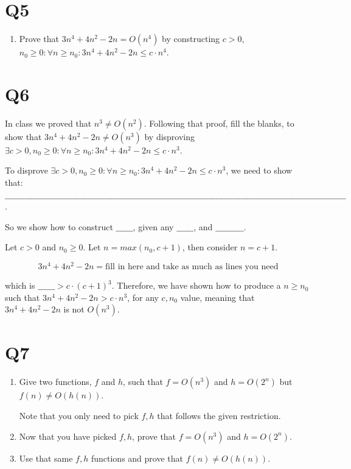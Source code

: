 \documentclass[12pt]{exam}
\begin{document}
\section{Q5}


\begin{enumerate}
    \item Prove that $3n^4 + 4n^2 - 2n = O(n^4)$ by constructing $c > 0$, $n_0 \geq 0 : \forall n \geq n_0 : 3n^4 + 4n^2 - 2n \leq c \cdot n^4.$
\end{enumerate}

\section{Q6}
In class we proved that $n^3 \neq O(n^2)$. Following that proof, fill the blanks, to show that $3n^4 + 4n^2 -2n \neq O(n^3)$ by disproving $\exists c > 0, n_0 \geq 0 : \forall n \geq n_0 : 3n^4 + 4n^2 -2n \leq c \cdot n^3$.

To disprove $\exists c > 0, n_0 \geq 0 : \forall n \geq n_0 : 3n^4 + 4n^2 -2n \leq c \cdot n^3$, we need to show that: $\_\_\_\_\_\_\_\_\_\_\_\_\_\_\_\_\_\_\_\_\_\_\_\_\_\_\_\_\_\_\_\_\_\_\_\_\_\_\_\_\_\_\_\_\_\_\_\_\_\_\_\_\_\_\_\_\_\_\_\_\_\_\_\_\_\_\_\_\_\_\_\_\_\_\_\_\_\_\_\_\_\_\_\_\_\_\_\_\_\_\_\_\_\_\_\_\_\_\_\_\_\_\_\_\_\_\_\_\_\_\_\_\_\_\_\_\_\_\_\_$.

So we show how to construct $\_\_\_\_\_\_$, given any $\_\_\_\_\_\_$, and $\_\_\_\_\_\_\_\_\_\_$.

Let $c > 0$ and $n_0 \geq 0$. Let $n = max(n_0, c + 1)$, then consider $n = c + 1$.

\[3n^4 + 4n^2 -2n = \text{fill in here and take as much as lines you need}\]


which is $\_\_\_\_\_\_ > c \cdot (c + 1)^3$. Therefore, we have shown how to produce a $n \geq n_0$ such that $3n^4 + 4n^2 -2n > c \cdot n^3$, for any $c, n_0$ value, meaning that $3n^4 + 4n^2 -2n$ is not $O(n^3)$.



\section{Q7}
\begin{enumerate}
    \item Give two functions, $f$ and $h$, such that $f = O(n^3)$ and $h = O(2^n)$ but $f(n)  \neq O(h(n))$.

    Note that you only need to pick $f,h$ that follows the given restriction.
    \item Now that you have picked $f,h$, prove that $f = O(n^3)$ and $h = O(2^n)$.

    \item Use that same $f,h$ functions and prove that $f(n) \neq O(h(n))$.
\end{enumerate}
\end{document}
